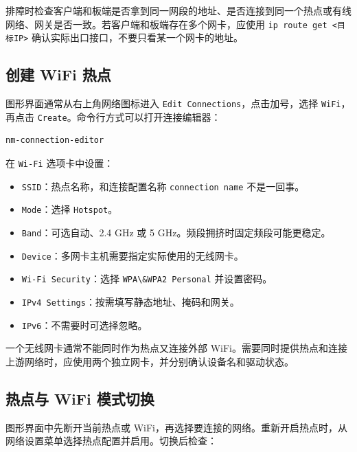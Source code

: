 排障时检查客户端和板端是否拿到同一网段的地址、是否连接到同一个热点或有线网络、网关是否一致。若客户端和板端存在多个网卡，应使用
\passthrough{\lstinline!ip route get <目标IP>!}
确认实际出口接口，不要只看某一个网卡的地址。

\subsection{创建 WiFi 热点}\label{ux521bux5efa-wifi-ux70edux70b9}

图形界面通常从右上角网络图标进入
\passthrough{\lstinline!Edit Connections!}，点击加号，选择
\passthrough{\lstinline!WiFi!}，再点击
\passthrough{\lstinline!Create!}。命令行方式可以打开连接编辑器：

\begin{lstlisting}[language=bash]
nm-connection-editor
\end{lstlisting}

在 \passthrough{\lstinline!Wi-Fi!} 选项卡中设置：

\begin{itemize}
\tightlist
\item
  \passthrough{\lstinline!SSID!}：热点名称，和连接配置名称
  \passthrough{\lstinline!connection name!} 不是一回事。
\item
  \passthrough{\lstinline!Mode!}：选择
  \passthrough{\lstinline!Hotspot!}。
\item
  \passthrough{\lstinline!Band!}：可选自动、2.4 GHz 或 5
  GHz。频段拥挤时固定频段可能更稳定。
\item
  \passthrough{\lstinline!Device!}：多网卡主机需要指定实际使用的无线网卡。
\item
  \passthrough{\lstinline!Wi-Fi Security!}：选择
  \passthrough{\lstinline!WPA\&WPA2 Personal!} 并设置密码。
\item
  \passthrough{\lstinline!IPv4 Settings!}：按需填写静态地址、掩码和网关。
\item
  \passthrough{\lstinline!IPv6!}：不需要时可选择忽略。
\end{itemize}

一个无线网卡通常不能同时作为热点又连接外部
WiFi。需要同时提供热点和连接上游网络时，应使用两个独立网卡，并分别确认设备名和驱动状态。

\subsection{热点与 WiFi
模式切换}\label{ux70edux70b9ux4e0e-wifi-ux6a21ux5f0fux5207ux6362}

图形界面中先断开当前热点或
WiFi，再选择要连接的网络。重新开启热点时，从网络设置菜单选择热点配置并启用。切换后检查：

